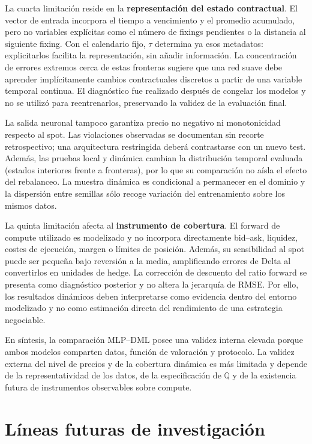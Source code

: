La cuarta limitación reside en la \textbf{representación del estado contractual}. El vector de entrada incorpora el tiempo a vencimiento y el promedio acumulado, pero no variables explícitas como el número de fixings pendientes o la distancia al siguiente fixing. Con el calendario fijo, $\tau$ determina ya esos metadatos: explicitarlos facilita la representación, sin añadir información. La concentración de errores extremos cerca de estas fronteras sugiere que una red suave debe aprender implícitamente cambios contractuales discretos a partir de una variable temporal continua. El diagnóstico fue realizado después de congelar los modelos y no se utilizó para reentrenarlos, preservando la validez de la evaluación final.

La salida neuronal tampoco garantiza precio no negativo ni monotonicidad respecto al spot. Las violaciones observadas se documentan sin recorte retrospectivo; una arquitectura restringida deberá contrastarse con un nuevo test. Además, las pruebas local y dinámica cambian la distribución temporal evaluada (estados interiores frente a fronteras), por lo que su comparación no aísla el efecto del rebalanceo. La muestra dinámica es condicional a permanecer en el dominio y la dispersión entre semillas sólo recoge variación del entrenamiento sobre los mismos datos.

La quinta limitación afecta al \textbf{instrumento de cobertura}. El forward de compute utilizado es modelizado y no incorpora directamente bid--ask, liquidez, costes de ejecución, margen o límites de posición. Además, su sensibilidad al spot puede ser pequeña bajo reversión a la media, amplificando errores de Delta al convertirlos en unidades de hedge. La corrección de descuento del ratio forward se presenta como diagnóstico posterior y no altera la jerarquía de RMSE. Por ello, los resultados dinámicos deben interpretarse como evidencia dentro del entorno modelizado y no como estimación directa del rendimiento de una estrategia negociable.

En síntesis, la comparación MLP--DML posee una validez interna elevada porque ambos modelos comparten datos, función de valoración y protocolo. La validez externa del nivel de precios y de la cobertura dinámica es más limitada y depende de la representatividad de los datos, de la especificación de $\mathbb Q$ y de la existencia futura de instrumentos observables sobre compute.

\section{Líneas futuras de investigación}
\label{sec:future_work}

